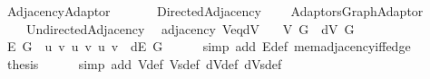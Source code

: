 %
\begin{isabellebody}%
%
%
\isadelimtheory
%
\endisadelimtheory
%
\isatagtheory
{}\isamarkupfalse%
\ Adjacency{\isacharunderscore}{\kern0pt}Adaptor\isanewline
\ \ \isanewline
\ \ \ \ Directed{\isacharunderscore}{\kern0pt}Adjacency\isanewline
\ \ \ \ {\isachardoublequoteopen}{\isachardot}{\kern0pt}{\isachardot}{\kern0pt}{\isacharslash}{\kern0pt}Adaptors{\isacharslash}{\kern0pt}Graph{\isacharunderscore}{\kern0pt}Adaptor{\isachardoublequoteclose}\isanewline
\ \ \ \ Undirected{\isacharunderscore}{\kern0pt}Adjacency\isanewline
{}%
\endisatagtheory
{\isafoldtheory}%
%
\isadelimtheory
%
\endisadelimtheory
%
\isadelimdocument
%
\endisadelimdocument
%
\isatagdocument
%
\isamarkuptrue%
%
\isamarkuptrue%
%
\endisatagdocument
{\isafolddocument}%
%
\isadelimdocument
%
\endisadelimdocument
{}\isamarkupfalse%
\ {\isacharparenleft}{\kern0pt}\ adjacency{\isacharparenright}{\kern0pt}\ V{\isacharunderscore}{\kern0pt}eq{\isacharunderscore}{\kern0pt}dV{\isacharcolon}{\kern0pt}\isanewline
\ \ \ {\isachardoublequoteopen}V\ G\ {\isacharequal}{\kern0pt}\ dV\ G{\isachardoublequoteclose}\isanewline
%
\isadelimproof
%
\endisadelimproof
%
\isatagproof
{}\isamarkupfalse%
\ {\isacharminus}{\kern0pt}\isanewline
\ \ \isamarkupfalse%
\ {\isachardoublequoteopen}E\ G\ {\isacharequal}{\kern0pt}\ {\isacharbraceleft}{\kern0pt}{\isacharbraceleft}{\kern0pt}u{\isacharcomma}{\kern0pt}\ v{\isacharbraceright}{\kern0pt}\ {\isacharbar}{\kern0pt}u\ v{\isachardot}{\kern0pt}\ {\isacharparenleft}{\kern0pt}u{\isacharcomma}{\kern0pt}\ v{\isacharparenright}{\kern0pt}\ {\isasymin}\ dE\ G{\isacharbraceright}{\kern0pt}{\isachardoublequoteclose}\isanewline
\ \ \ \ \isamarkupfalse%
\ {\isacharparenleft}{\kern0pt}simp\ add{\isacharcolon}{\kern0pt}\ E{\isacharunderscore}{\kern0pt}def\ mem{\isacharunderscore}{\kern0pt}adjacency{\isacharunderscore}{\kern0pt}iff{\isacharunderscore}{\kern0pt}edge{\isacharparenright}{\kern0pt}\isanewline
\ \ \isamarkupfalse%
\ {\isacharquery}{\kern0pt}thesis\isanewline
\ \ \ \ \isamarkupfalse%
\ {\isacharparenleft}{\kern0pt}simp\ add{\isacharcolon}{\kern0pt}\ V{\isacharunderscore}{\kern0pt}def\ Vs{\isacharunderscore}{\kern0pt}def\ dV{\isacharunderscore}{\kern0pt}def\ dVs{\isacharunderscore}{\kern0pt}def{\isacharparenright}{\kern0pt}\isanewline

\end{isabellebody}
